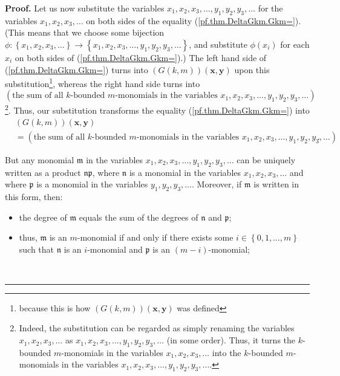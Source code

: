 \documentclass[numbers=enddot,12pt,final,onecolumn,notitlepage]{scrartcl}%
\theoremstyle{definition}
\newenvironment{proof}[1][Proof]{\noindent\textbf{#1.} }{\ \rule{0.5em}{0.5em}}
\begin{document}
\begin{proof}
Let us now substitute the variables $x_{1},x_{2},x_{3},\ldots,y_{1}%
,y_{2},y_{3},\ldots$ for the variables $x_{1},x_{2},x_{3},\ldots$ on both
sides of the equality (\ref{pf.thm.DeltaGkm.Gkm=}). (This means that we choose
some bijection $\phi:\left\{  x_{1},x_{2},x_{3},\ldots\right\}  \rightarrow
\left\{  x_{1},x_{2},x_{3},\ldots,y_{1},y_{2},y_{3},\ldots\right\}  $, and
substitute $\phi\left(  x_{i}\right)  $ for each $x_{i}$ on both sides of
(\ref{pf.thm.DeltaGkm.Gkm=}).) The left hand side of
(\ref{pf.thm.DeltaGkm.Gkm=}) turns into $\left(  G\left(  k,m\right)  \right)
\left(  \mathbf{x},\mathbf{y}\right)  $ upon this
substitution\footnote{because this is how $\left(  G\left(  k,m\right)
\right)  \left(  \mathbf{x},\mathbf{y}\right)  $ was defined}, whereas the
right hand side turns into%
\[
\left(  \text{the sum of all }k\text{-bounded }m\text{-monomials in the
variables }x_{1},x_{2},x_{3},\ldots,y_{1},y_{2},y_{3},\ldots\right)
\]
\footnote{Indeed, the substitution can be regarded as simply renaming the
variables $x_{1},x_{2},x_{3},\ldots$ as $x_{1},x_{2},x_{3},\ldots,y_{1}%
,y_{2},y_{3},\ldots$ (in some order). Thus, it turns the $k$-bounded
$m$-monomials in the variables $x_{1},x_{2},x_{3},\ldots$ into the $k$-bounded
$m$-monomials in the variables $x_{1},x_{2},x_{3},\ldots,y_{1},y_{2}%
,y_{3},\ldots$.}. Thus, our substitution transforms the equality
(\ref{pf.thm.DeltaGkm.Gkm=}) into%
\begin{align}
&  \left(  G\left(  k,m\right)  \right)  \left(  \mathbf{x},\mathbf{y}\right)
\nonumber\\
&  =\left(  \text{the sum of all }k\text{-bounded }m\text{-monomials in the
variables }x_{1},x_{2},x_{3},\ldots,y_{1},y_{2},y_{3},\ldots\right)  .
\label{pf.thm.DeltaGkm.Gkmxy=}%
\end{align}


But any monomial $\mathfrak{m}$ in the variables $x_{1},x_{2},x_{3}%
,\ldots,y_{1},y_{2},y_{3},\ldots$ can be uniquely written as a product
$\mathfrak{np}$, where $\mathfrak{n}$ is a monomial in the variables
$x_{1},x_{2},x_{3},\ldots$ and where $\mathfrak{p}$ is a monomial in the
variables $y_{1},y_{2},y_{3},\ldots$. Moreover, if $\mathfrak{m}$ is written
in this form, then:

\begin{itemize}
\item the degree of $\mathfrak{m}$ equals the sum of the degrees of
$\mathfrak{n}$ and $\mathfrak{p}$;

\item thus, $\mathfrak{m}$ is an $m$-monomial if and only if there exists some
$i\in\left\{  0,1,\ldots,m\right\}  $ such that $\mathfrak{n}$ is an
$i$-monomial and $\mathfrak{p}$ is an $\left(  m-i\right)  $-monomial;


\end{itemize}
\end{proof}
\end{document}
